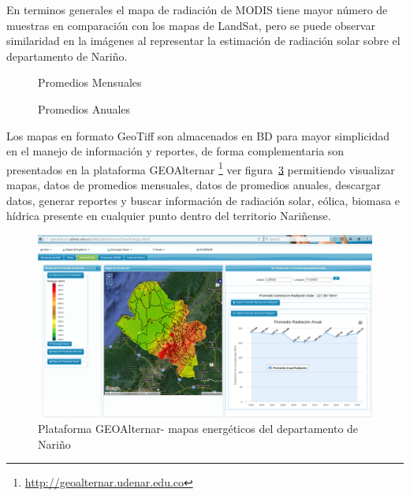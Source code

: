 En terminos generales el mapa de radiación de MODIS tiene mayor número de muestras en comparación con los mapas de LandSat, pero se puede observar
similaridad en la imágenes al representar la estimación de radiación solar sobre el departamento de Nariño.

\begin{figure}[htb]
  \centering
  \hspace{5mm}
  \label{fig:agregadosm}
  \caption{Promedios Mensuales}
\end{figure}

\begin{figure}[htb]
  \centering
  \hspace{4mm}
  \label{fig:agregadosa}
  \caption{Promedios Anuales}
\end{figure}

Los mapas en formato GeoTiff son almacenados en BD para mayor simplicidad en el manejo de información y reportes, de forma complementaria son presentados en la 
plataforma GEOAlternar \footnote{\url{http://geoalternar.udenar.edu.co}} ver figura~\ref{fig:plataforma} permitiendo visualizar mapas, datos de promedios mensuales, 
datos de promedios anuales, descargar datos, generar reportes y buscar información de radiación solar, eólica, biomasa e hídrica presente en cualquier punto dentro 
del territorio Nariñense.
\begin{figure}[tbp]
  \centering 
  \includegraphics[scale=0.3]{pictures/plataforma.png}
  \caption{ Plataforma GEOAlternar- mapas energéticos del departamento de Nariño}
  \label{fig:plataforma}
\end{figure}

